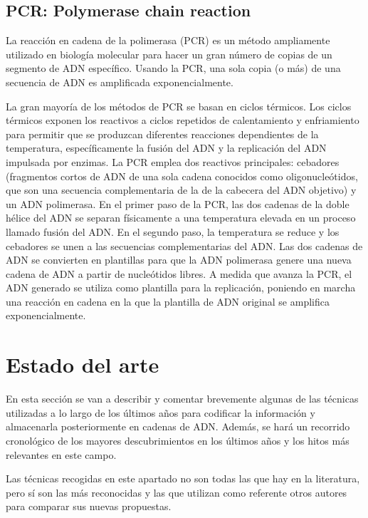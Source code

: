 \documentclass[a4paper,11pt]{article}
\begin{document}
\subsection{PCR: Polymerase chain reaction}

La reacción en cadena de la polimerasa (PCR) es un método ampliamente utilizado en biología molecular para hacer un gran número de copias de un segmento de ADN específico. Usando la PCR, una sola copia (o más) de una secuencia de ADN es amplificada exponencialmente.

La gran mayoría de los métodos de PCR se basan en ciclos térmicos. Los ciclos térmicos exponen los reactivos a ciclos repetidos de calentamiento y enfriamiento para permitir que se produzcan diferentes reacciones dependientes de la temperatura, específicamente la fusión del ADN y la replicación del ADN impulsada por enzimas. La PCR emplea dos reactivos principales: cebadores (fragmentos cortos de ADN de una sola cadena conocidos como oligonucleótidos, que son una secuencia complementaria de la de la cabecera del ADN objetivo) y un ADN polimerasa. En el primer paso de la PCR, las dos cadenas de la doble hélice del ADN se separan físicamente a una temperatura elevada en un proceso llamado fusión del ADN. En el segundo paso, la temperatura se reduce y los cebadores se unen a las secuencias complementarias del ADN. Las dos cadenas de ADN se convierten en plantillas para que la ADN polimerasa genere una nueva cadena de ADN a partir de nucleótidos libres. A medida que avanza la PCR, el ADN generado se utiliza como plantilla para la replicación, poniendo en marcha una reacción en cadena en la que la plantilla de ADN original se amplifica exponencialmente.


\section{Estado del arte} 

En esta sección se van a describir y comentar brevemente algunas de las técnicas utilizadas a lo largo de los últimos años para codificar la información y almacenarla posteriormente en cadenas de ADN. Además, se hará un recorrido cronológico de los mayores descubrimientos en los últimos años y los hitos más relevantes en este campo.

Las técnicas recogidas en este apartado no son todas las que hay en la literatura, pero sí son las más reconocidas y las que utilizan como referente otros autores para comparar sus nuevas propuestas. 
\end{document}
